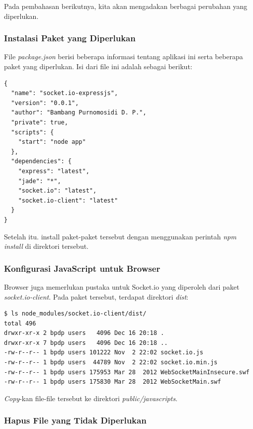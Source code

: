 Pada pembahasan berikutnya, kita akan mengadakan berbagai perubahan yang diperlukan.

\subsubsection{Instalasi Paket yang Diperlukan}

File \textit{package.json} berisi beberapa informasi tentang aplikasi ini serta beberapa paket yang diperlukan. Isi dari file ini adalah sebagai berikut:

\lstset{language=JavaScript,caption=package.json}
\begin{lstlisting}
{
  "name": "socket.io-expressjs",
  "version": "0.0.1",
  "author": "Bambang Purnomosidi D. P.",
  "private": true,
  "scripts": {
    "start": "node app"
  },
  "dependencies": {
    "express": "latest",
    "jade": "*",
    "socket.io": "latest",
    "socket.io-client": "latest"
  }
}
\end{lstlisting}

Setelah itu. install paket-paket tersebut dengan menggunakan perintah \textit{npm install} di direktori tersebut. 

\subsubsection{Konfigurasi JavaScript untuk Browser}

Browser juga memerlukan pustaka untuk Socket.io yang diperoleh dari paket \textit{socket.io-client}. Pada paket tersebut, terdapat direktori \textit{dist}:

\lstset{language=Bash,caption=Isi direktori dist di socket.io-client}
\begin{lstlisting}
$ ls node_modules/socket.io-client/dist/
total 496
drwxr-xr-x 2 bpdp users   4096 Dec 16 20:18 .
drwxr-xr-x 7 bpdp users   4096 Dec 16 20:18 ..
-rw-r--r-- 1 bpdp users 101222 Nov  2 22:02 socket.io.js
-rw-r--r-- 1 bpdp users  44789 Nov  2 22:02 socket.io.min.js
-rw-r--r-- 1 bpdp users 175953 Mar 28  2012 WebSocketMainInsecure.swf
-rw-r--r-- 1 bpdp users 175830 Mar 28  2012 WebSocketMain.swf
\end{lstlisting}

\textit{Copy}-kan file-file tersebut ke direktori \textit{public/javascripts}.

\subsubsection{Hapus File yang Tidak Diperlukan}

